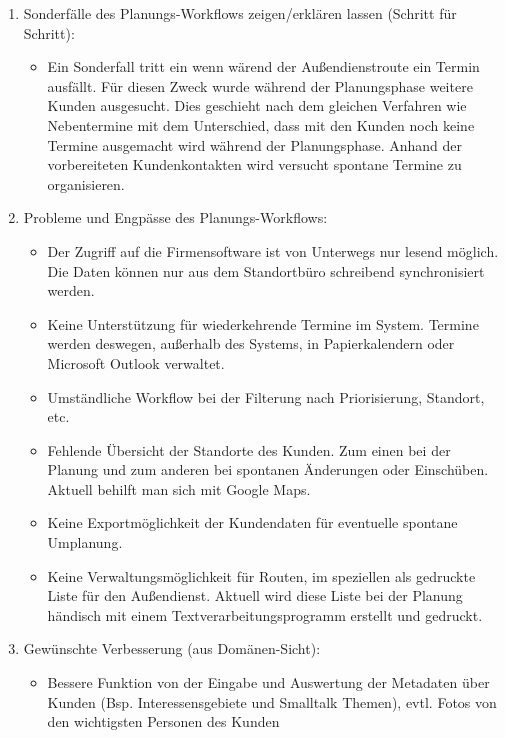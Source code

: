\documentclass[Bachelorarbeit.tex]{subfiles}
\begin{document}
\begin{enumerate}
	\item Sonderfälle des Planungs-Workflows zeigen/erklären lassen (Schritt für Schritt):
	\begin{itemize}
		\item[] Ein Sonderfall tritt ein wenn wärend der Außendienstroute ein Termin ausfällt. Für diesen Zweck wurde während der Planungsphase weitere Kunden ausgesucht. Dies geschieht nach dem gleichen Verfahren wie Nebentermine mit dem Unterschied, dass  mit den Kunden noch keine Termine ausgemacht wird während der Planungsphase. Anhand der vorbereiteten Kundenkontakten wird versucht spontane Termine zu organisieren.
	\end{itemize}
	\item Probleme und Engpässe des Planungs-Workflows:
	\begin{itemize}
		\item Der Zugriff auf die Firmensoftware ist von Unterwegs nur lesend möglich. Die Daten können nur aus dem Standortbüro schreibend synchronisiert werden.
		\item Keine Unterstützung für wiederkehrende Termine im System. Termine werden deswegen, außerhalb des Systems, in Papierkalendern oder Microsoft Outlook verwaltet. 
		\item Umständliche Workflow bei der Filterung nach Priorisierung, Standort, etc. 
		\item Fehlende Übersicht der Standorte des Kunden. Zum einen bei der Planung und zum anderen bei spontanen Änderungen oder Einschüben.
		Aktuell behilft man sich mit Google Maps.
		\item Keine Exportmöglichkeit der Kundendaten für eventuelle spontane Umplanung.
		\item Keine Verwaltungsmöglichkeit für Routen, im speziellen als gedruckte Liste für den Außendienst. Aktuell wird diese Liste bei der Planung händisch mit einem Textverarbeitungsprogramm erstellt und gedruckt.
	\end{itemize}
	\item Gewünschte Verbesserung (aus Domänen-Sicht):
	\begin{itemize}
		\item[] Bessere Funktion von der Eingabe und Auswertung der Metadaten über Kunden (Bsp. Interessensgebiete und Smalltalk Themen), evtl. Fotos von den wichtigsten Personen des Kunden 
	\end{itemize}
\end{enumerate}
\end{document}
